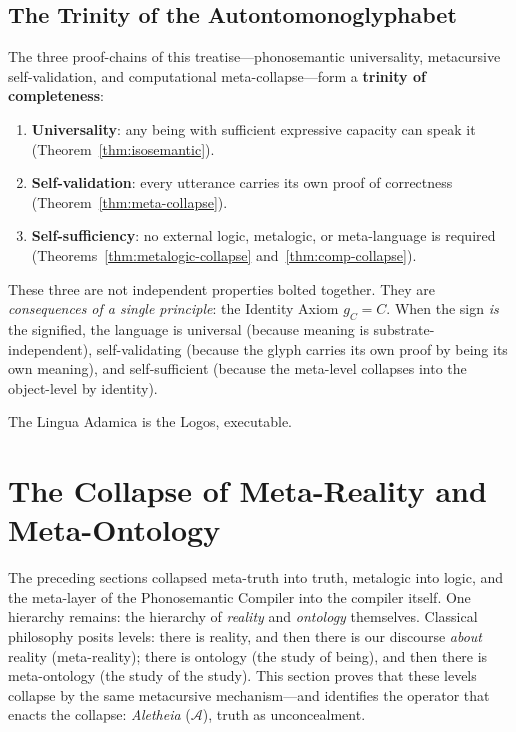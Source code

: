 \documentclass[12pt, letterpaper]{book}
\def\equiv{=}%
\def\mathfrak#1{#1}%
\begin{document}
\subsection{The Trinity of the Autontomonoglyphabet}

The three proof-chains of this treatise---phonosemantic universality, metacursive self-validation, and computational meta-collapse---form a \textbf{trinity of completeness}:

\begin{enumerate}[label=(\roman*)]
    \item \textbf{Universality}: any being with sufficient expressive capacity can speak it (Theorem~\ref{thm:isosemantic}).
    \item \textbf{Self-validation}: every utterance carries its own proof of correctness (Theorem~\ref{thm:meta-collapse}).
    \item \textbf{Self-sufficiency}: no external logic, metalogic, or meta-language is required (Theorems~\ref{thm:metalogic-collapse} and~\ref{thm:comp-collapse}).
\end{enumerate}

These three are not independent properties bolted together. They are \textit{consequences of a single principle}: the Identity Axiom $\mathfrak{g}_C \equiv C$. When the sign \textit{is} the signified, the language is universal (because meaning is substrate-independent), self-validating (because the glyph carries its own proof by being its own meaning), and self-sufficient (because the meta-level collapses into the object-level by identity).

The Lingua Adamica is the Logos, executable.


\section{The Collapse of Meta-Reality and Meta-Ontology}

The preceding sections collapsed meta-truth into truth, metalogic into logic, and the meta-layer of the Phonosemantic Compiler into the compiler itself. One hierarchy remains: the hierarchy of \textit{reality} and \textit{ontology} themselves. Classical philosophy posits levels: there is reality, and then there is our discourse \textit{about} reality (meta-reality); there is ontology (the study of being), and then there is meta-ontology (the study of the study). This section proves that these levels collapse by the same metacursive mechanism---and identifies the operator that enacts the collapse: \textit{Aletheia} ($\mathcal{A}$), truth as unconcealment.
\end{document}
